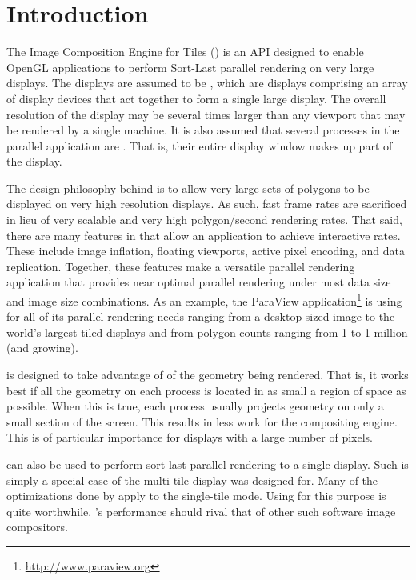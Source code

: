 

\chapter{Introduction}
\label{chap:Introduction}

The Image Composition Engine for Tiles (\IceT) is an API designed to enable
OpenGL applications to perform Sort-Last parallel rendering on very large
displays.  The displays are assumed to be
, which are displays
comprising an array of display devices that act together to form a single
large display.  The overall resolution of the display may be several times
larger than any viewport that may be rendered by a single machine.  It is
also assumed that several processes in the parallel application are
.  That is, their entire
display window makes up part of the display.

The design philosophy behind \IceT is to allow very large sets of polygons
to be displayed on very high resolution displays.  As such, fast frame
rates are sacrificed in lieu of very scalable and very high polygon/second
rendering rates.  That said, there are many features in \IceT that allow an
application to achieve interactive rates.  These include image inflation,
floating viewports, active pixel encoding, and data replication.  Together,
these features make \IceT a versatile parallel rendering application that
provides near optimal parallel rendering under most data size and image
size combinations.  As an example, the ParaView
application\footnote{\href{http://www.paraview.org}{http://www.paraview.org}}
is using \IceT for all of its parallel rendering needs ranging from a
desktop sized image to the world's largest tiled displays and from polygon
counts ranging from 1 to 1 million (and growing).

\IceT is designed to take advantage of
 of the
geometry being rendered.  That is, it works best if all the geometry on
each process is located in as small a region of space as possible.  When
this is true, each process usually projects geometry on only a small
section of the screen.  This results in less work for the compositing
engine.  This is of particular importance for displays with a large number
of pixels.

\IceT can also be used to perform sort-last parallel rendering to a single
display.  Such 
is simply a special case of the multi-tile display \IceT was designed for.
Many of the optimizations done by \IceT apply to the single-tile mode.
Using \IceT for this purpose is quite worthwhile.  \IceT's performance
should rival that of other such software image compositors.

